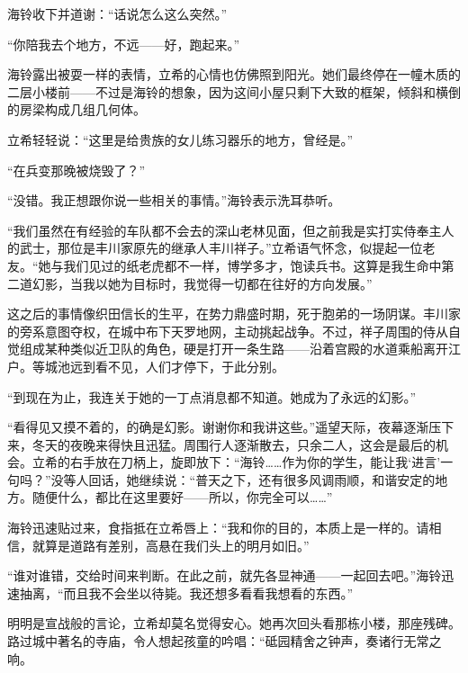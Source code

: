 \documentclass{article}
\begin{document}
海铃收下并道谢：“话说怎么这么突然。”



“你陪我去个地方，不远——好，跑起来。”



海铃露出被耍一样的表情，立希的心情也仿佛照到阳光。她们最终停在一幢木质的二层小楼前——不过是海铃的想象，因为这间小屋只剩下大致的框架，倾斜和横倒的房梁构成几组几何体。



立希轻轻说：“这里是给贵族的女儿练习器乐的地方，曾经是。”



“在兵变那晚被烧毁了？”



“没错。我正想跟你说一些相关的事情。”海铃表示洗耳恭听。



“我们虽然在有经验的车队都不会去的深山老林见面，但之前我是实打实侍奉主人的武士，那位是丰川家原先的继承人丰川祥子。”立希语气怀念，似提起一位老友。“她与我们见过的纸老虎都不一样，博学多才，饱读兵书。这算是我生命中第二道幻影，当我以她为目标时，我觉得一切都在往好的方向发展。”



这之后的事情像织田信长的生平，在势力鼎盛时期，死于胞弟的一场阴谋。丰川家的旁系意图夺权，在城中布下天罗地网，主动挑起战争。不过，祥子周围的侍从自觉组成某种类似近卫队的角色，硬是打开一条生路——沿着宫殿的水道乘船离开江户。等城池远到看不见，人们才停下，于此分别。



“到现在为止，我连关于她的一丁点消息都不知道。她成为了永远的幻影。”



“看得见又摸不着的，的确是幻影。谢谢你和我讲这些。”遥望天际，夜幕逐渐压下来，冬天的夜晚来得快且迅猛。周围行人逐渐散去，只余二人，这会是最后的机会。立希的右手放在刀柄上，旋即放下：“海铃……作为你的学生，能让我‘进言’一句吗？”没等人回话，她继续说：“普天之下，还有很多风调雨顺，和谐安定的地方。随便什么，都比在这里要好——所以，你完全可以……”



海铃迅速贴过来，食指抵在立希唇上：“我和你的目的，本质上是一样的。请相信，就算是道路有差别，高悬在我们头上的明月如旧。”



“谁对谁错，交给时间来判断。在此之前，就先各显神通——一起回去吧。”海铃迅速抽离，“而且我不会坐以待毙。我还想多看看我想看的东西。”



明明是宣战般的言论，立希却莫名觉得安心。她再次回头看那栋小楼，那座残碑。路过城中著名的寺庙，令人想起孩童的吟唱：“砥园精舍之钟声，奏诸行无常之响。
\end{document}
